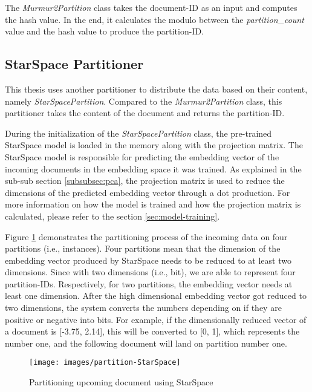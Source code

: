 The \emph{Murmur2Partition} class takes the document-ID as an input and computes the hash value. In the end, it calculates the modulo between the \emph{partition\_count} value and the hash value to produce the partition-ID. 

\subsection{StarSpace Partitioner}
\label{subsec:partitioning-star-space}
This thesis uses another partitioner to distribute the data based on their content, namely \emph{StarSpacePartition}. Compared to the \emph{Murmur2Partition} class, this partitioner takes the content of the document and returns the partition-ID.


During the initialization of the \emph{StarSpacePartition} class, the pre-trained StarSpace model is loaded in the memory along with the projection matrix. The StarSpace model is responsible for predicting the embedding vector of the incoming documents in the embedding space it was trained. As explained in the sub-sub section \ref{subsubsec:pca}, the projection matrix is used to reduce the dimensions of the predicted embedding vector through a dot production. For more information on how the model is trained and how the projection matrix is calculated, please refer to the section \ref{sec:model-training}.


Figure \ref{fig:star-space-partitioning-process} demonstrates the partitioning process of the incoming data on four partitions (i.e., instances). Four partitions mean that the dimension of the embedding vector produced by StarSpace needs to be reduced to at least two dimensions. Since with two dimensions (i.e., bit), we are able to represent four partition-IDs. Respectively, for two partitions, the embedding vector needs at least one dimension. After the high dimensional embedding vector got reduced to two dimensions, the system converts the numbers depending on if they are positive or negative into bits. For example, if the dimensionally reduced vector of a document is [-3.75, 2.14], this will be converted to [0, 1], which represents the number one, and the following document will land on partition number one.


\begin{figure}[!ht]
    \centering
    \texttt{[image: images/partition-StarSpace]}
    \caption{Partitioning upcoming document using StarSpace}
    \label{fig:star-space-partitioning-process}
\end{figure}


